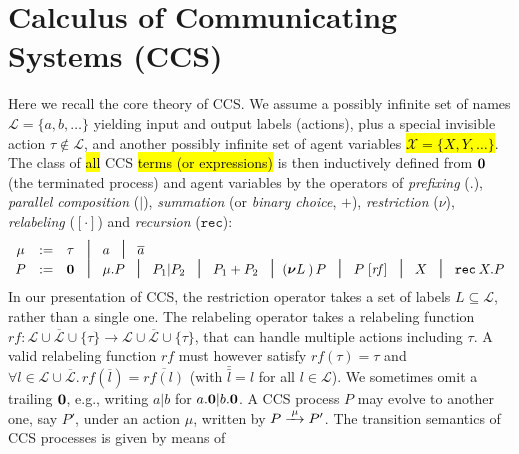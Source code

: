 
\section{Calculus of Communicating Systems (CCS)}
\label{ss:ccs}

Here we recall the core theory of CCS.
We assume a possibly infinite set of names $\mathscr{L} = \{a, b,
\ldots\}$ yielding input and output labels (actions), plus a special invisible
action $\tau \notin \mathscr{L}$, and another possibly infinite
set of agent variables \hl{$\mathscr{X} = \{X, Y, \ldots\}$}.
The class of \hl{all} CCS \hl{terms (or expressions)} is then inductively
defined from ${\boldsymbol 0}$ (the terminated process) and agent variables by the operators
of \emph{prefixing} (.), \emph{parallel composition} ($|$),
\emph{summation}
(or \emph{binary choice}, $+$),
\emph{restriction} ($\nu$), \emph{relabeling} ($[\cdot]$) and
\emph{recursion} ($\texttt{rec}$):
\begin{equation*}
\begin{array}{cccl}
\mu  & := & \tau\!\!\!\! & \midd \; a  \; \midd \;  \outC a  \\
P  & := & \nil\!\!\!\! & \midd \;  \mu . P \; \midd \;  P_1 |  P_2 \; \midd  \;
P_1 + P_2 \; \midd 
(\res L)\, P
\; \midd \; P\; [\mathit{rf}]  %
\;  \midd \;  X \; \midd \; \recu X P
\end{array}
\end{equation*}
In our presentation of CCS, the restriction operator takes a set of labels $L
  \subseteq \mathscr{L}$, rather than a single one.  
The relabeling operator takes a relabeling function
  $\mathit{rf} \colon \mathscr{L} \cup \overline{\mathscr{L}} \cup
    \{\tau\} \rightarrow \mathscr{L} \cup \overline{\mathscr{L}} \cup
    \{\tau\}$, that can  handle multiple actions including $\tau$. A valid
    relabeling function $\mathit{rf}$ must however 
satisfy $\mathit{rf}(\tau) =
    \tau$ and $\forall l\in\mathscr{L} \cup \overline{\mathscr{L}}.\, \mathit{rf}(\overline{l}) =
    \overline{\mathit{rf}(l)}$ (with $\bar{\bar l} = l$ for all $l \in
    \mathscr{L}$).
We sometimes omit a trailing ${\boldsymbol 0}$, e.g., writing $a|b$ for $a.{\boldsymbol 0} |b .{\boldsymbol 0}$.
A CCS process $P$ may evolve to another one, say $P'$, under
  an action $\mu$, written by $P \arr{\mu} P'$.
The transition semantics of CCS processes is given by means of
